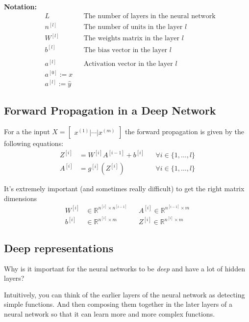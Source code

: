 \textbf{Notation:}
\begin{align*}
    &L && \text{The number of layers in the neural network} \\
    &n^{[l]} && \text{The number of units in the layer } l \\
    &W^{[l]} && \text{The weights matrix in the layer } l \\
    &b^{[l]} && \text{The bias vector in the layer } l \\ \\
    &a^{[l]} && \text{Activation vector in the layer } l \\
    &a^{[0]} := x \\
    &a^{[l]} := \hat{y}
\end{align*}

\subsection*{Forward Propagation in a Deep Network}

For a the input $X = \begin{bmatrix} x^{(1)} | \cdots | x^{(m)} \end{bmatrix}$ 
the forward propagation is given by the following equations:
\begin{align*}
    Z^{[i]} &= W^{[i]}A^{[i-1]} + b^{[i]}  &&\forall i \in\{1,\dots,l\} \\
    A^{[i]} &= g^{[i]}(Z^{[i]}) && \forall i \in\{1,\dots,l\}
\end{align*}

It's extremely important (and sometimes really difficult) to get the right matrix 
dimensions
\begin{align*}
    W^{[i]} &\in \mathbb{R}^{n^{[i]} \times n^{[i-1]}} &&
    A^{[i]} \in \mathbb{R}^{n^{[i-1]} \times m} \\
    b^{[i]} &\in \mathbb{R}^{n^{[i]} \times m} &&
    Z^{[i]} \in \mathbb{R}^{n^{[i]} \times m} 
\end{align*}
\subsection*{Deep representations}
Why is it important for the neural networks to be \textit{deep} and have a lot of hidden
layers?

Intuitively, you can think of the earlier layers of the neural network as detecting 
simple functions. And then composing them together in the later 
layers of a neural network so that it can learn more and more complex functions.

